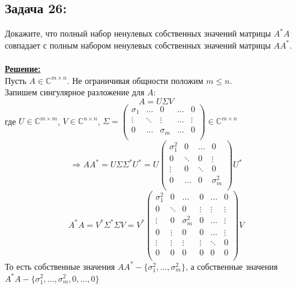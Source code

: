 \documentclass[a4paper,12pt,titlepage,final]{article}
\begin{document}
\subsection*{Задача 26:}
\noindent Докажите, что полный набор ненулевых собственных значений матрицы $A^*A$ совпадает с полным набором ненулевых собственных значений матрицы $AA^*$.\\ \\
\textbf{\underline{Решение:}} \\
Пусть $A \in \mathbb{C}^{m \times n}$. Не ограничивая общности положим $m \leq n$. \\
Запишем сингулярное разложение для $A$:
$$A = U\Sigma V$$
где $U \in \mathbb{C}^{m \times m}$, $V \in \mathbb{C}^{n \times n}$, $\Sigma = 
\begin{pmatrix} 
\sigma_1 & \ldots & 0 & \ldots & 0 \\
\vdots & \ddots & \vdots & \ldots & \vdots \\
0 & \ldots & \sigma_m & \ldots & 0 \\
\end{pmatrix} \in \mathbb{C}^{m \times n}$ 
$$\Rightarrow AA^* = U\Sigma\Sigma^* U^* = U
\begin{pmatrix} 
    \sigma_1^2 & 0 & \ldots & 0 \\
    0 & \ddots & 0 & \vdots \\
    \vdots & 0 & \ddots & 0 \\
    0 & \ldots & 0 & \sigma_m^2 \\
\end{pmatrix}U^*$$
$$
A^*A = V^*\Sigma^*\Sigma V = V^*
\begin{pmatrix} 
    \sigma_1^2 & 0 & \ldots & 0 & \ldots & 0\\
    0 & \ddots & 0 & \vdots & \vdots & \vdots\\
    \vdots & 0 & \sigma_m^2 & 0  & \ldots & \vdots\\
    0 & \vdots & 0 & 0 & \ldots & \vdots\\
    \vdots & \vdots & \vdots & \vdots & \ddots & 0\\
    0 & 0 & 0 & 0 & 0 & 0 \\
\end{pmatrix}V
$$
То есть собственные значения $AA^* - \{\sigma_1^2, \ldots, \sigma_m^2\}$, а собственные значения $A^*A - \{\sigma_1^2, \ldots, \sigma_m^2, 0, \ldots, 0 \}$ \blacksquare \\ \\ \\
\end{document}
